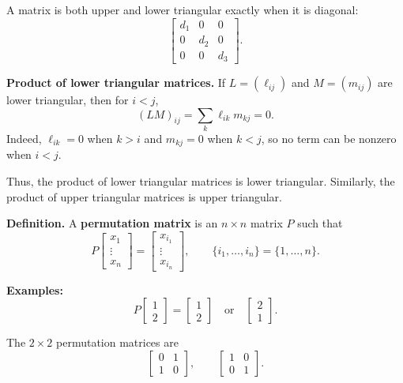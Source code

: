 \documentclass{article}
\begin{document}
\medskip

A matrix is both upper and lower triangular exactly when it is diagonal:
\[
\begin{bmatrix}d_1&0&0\\0&d_2&0\\0&0&d_3\end{bmatrix}.
\]

\medskip

\textbf{Product of lower triangular matrices.} If $L=(\ell_{ij})$ and $M=(m_{ij})$ are lower triangular, then for $i<j$,
\[
(LM)_{ij}=\sum_k \ell_{ik}m_{kj}=0.
\]
Indeed, $\ell_{ik}=0$ when $k>i$ and $m_{kj}=0$ when $k<j$, so no term can be nonzero when $i<j$.

\medskip

Thus, the product of lower triangular matrices is lower triangular. Similarly, the product of upper triangular matrices is upper triangular.

\medskip

\textbf{Definition.} A \textbf{permutation matrix} is an $n\times n$ matrix $P$ such that
\[
P\begin{bmatrix}x_1\\ \vdots\\ x_n\end{bmatrix}
=
\begin{bmatrix}x_{i_1}\\ \vdots\\ x_{i_n}\end{bmatrix},
\qquad
\{i_1,\ldots,i_n\}=\{1,\ldots,n\}.
\]

\textbf{Examples:}
\[
P\begin{bmatrix}1\\2\end{bmatrix}
=
\begin{bmatrix}1\\2\end{bmatrix}
\quad\text{or}\quad
\begin{bmatrix}2\\1\end{bmatrix}.
\]

The $2\times2$ permutation matrices are
\[
\begin{bmatrix}0&1\\1&0\end{bmatrix},
\qquad
\begin{bmatrix}1&0\\0&1\end{bmatrix}.
\]

\newpage
\end{document}
